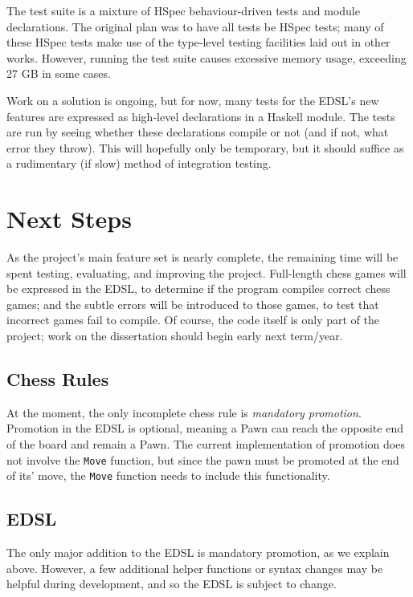 \documentclass[12pt, a4paper]{scrartcl}
\begin{document}
The test suite is a mixture of HSpec behaviour-driven tests\cite{hspec} and module declarations. The original plan was to have all tests be HSpec tests; many of these HSpec tests make use of the type-level testing facilities laid out in other works\cite{mezzo}. However, running the test suite causes excessive memory usage, exceeding 27 GB in some cases.

Work on a solution is ongoing, but for now, many tests for the EDSL's new features are expressed as high-level declarations in a Haskell module. The tests are run by seeing whether these declarations compile or not (and if not, what error they throw). This will hopefully only be temporary, but it should suffice as a rudimentary (if slow) method of integration testing.

\section{Next Steps}

As the project's main feature set is nearly complete, the remaining time will be spent testing, evaluating, and improving the project. Full-length chess games will be expressed in the EDSL, to determine if the program compiles correct chess games; and the subtle errors will be introduced to those games, to test that incorrect games fail to compile. Of course, the code itself is only part of the project; work on the dissertation should begin early next term/year.

\subsection{Chess Rules}

At the moment, the only incomplete chess rule is \emph{mandatory promotion}. Promotion in the EDSL is optional, meaning a Pawn can reach the opposite end of the board and remain a Pawn. The current implementation of promotion does not involve the \lstinline{Move} function, but since the pawn must be promoted at the end of its' move, the \lstinline{Move} function needs to include this functionality.

\subsection{EDSL}

The only major addition to the EDSL is mandatory promotion, as we explain above. However, a few additional helper functions or syntax changes may be helpful during development, and so the EDSL is subject to change.
\end{document}
